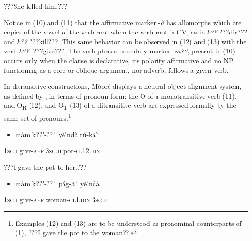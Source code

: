 \documentclass[output=paper]{langsci/langscibook}
\begin{document}
{\begin{styleTranslation}
???She killed him.???
\end{styleTranslation}

Notice in (10) and (11) that the affirmative marker -\textit{\`{a}} has allomorphs which are copies of the vowel of the verb root when the verb root is CV, as in \textit{k??} ???die??? and \textit{k??} ???kill???. This same behavior can be observed in (12) and (13) with the verb \textit{k??\'{ }} ???give???. The verb phrase boundary marker -\textit{m??}, present in (10), occurs only when the clause is declarative, its polarity affirmative and no NP functioning as a core or oblique argument, nor adverb, follows a given verb.  

In ditransitive constructions, M\`{o}or\'{e} displays a neutral-object alignment system, as defined by \citet{MalchukovEtAl2010}, in terms of pronoun form: the O of a monotransitive verb (11), and O\textsubscript{R} (12), and O\textsubscript{T} (13) of a ditransitive verb are expressed formally by the same set of pronouns.\footnote{{ }Examples (12) and (13) are to be understood as pronominal counterparts of (1), ???I gave the pot to the woman??.  } 

\begin{itemize}
\item \begin{styleNumberedEX}
\label{bkm:Ref424141642}m\`{a}m    k??\'{ }-??\`{ }      y\~{e}\'{ }nd\`{a}    r\'{u}-k\~{a}\`{ }
\end{styleNumberedEX}\end{itemize}
\begin{styleGloss}
\textsc{1sg.i  }  give-\textsc{aff}    \textsc{3sg.ii  }  pot\textsc{{}-cl12.idn}
\end{styleGloss}

\begin{styleTranslation}
???I gave the pot to her.???
\end{styleTranslation}

\begin{itemize}
\item \begin{styleNumberedEX}
\label{bkm:Ref424141648}m\`{a}m    k??\'{ }-??\`{ }    p\'{a}g-\~{a}\`{ }      y\~{e}\'{ }nd\`{a}
\end{styleNumberedEX}\end{itemize}
\begin{styleGloss}
\textsc{1sg.i  }  give-\textsc{aff}  woman-\textsc{cl1.idn}  \textsc{3sg.ii}
\end{styleGloss}

}
\end{document}
